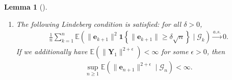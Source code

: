 \documentclass[12pt]{amsart}
\theoremstyle{plain}
\newtheorem{lemma}[theorem]{Lemma}
\theoremstyle{remark}
\numberwithin{equation}{section}
\begin{document}
\begin{lemma}[]
{\begin{enumerate}
Additionally, if $\boldsymbol{\Gamma}_n \stackrel{a.s.}{\to} \boldsymbol{x}_0$ for some $\boldsymbol{x}_0 \in {D}_s$ and $\boldsymbol{\mathcal{P}}$ is continuous at $\boldsymbol{x}_0$, then
\begin{align}\label{eq:lem-Sigmaconv}
\sigma^2\left(\boldsymbol{\Gamma}_{n}\right) \stackrel{a.s.}{\to} \sigma^2\left(\boldsymbol{x}_0\right), \quad \boldsymbol{\Sigma}\left(\boldsymbol{\Gamma}_{n}\right) \stackrel{a.s.}{\to} \boldsymbol{\Sigma}\left(\boldsymbol{x}_0\right).
\end{align}
\item{}\label{item3} The following Lindeberg condition is satisfied: for all $\delta > 0$,
    \begin{align}\label{eq:lind}
    \frac{1}{n}\sum_{k=1}^{n}\mathbb{E}\left( \|\boldsymbol{e}_{k+1}\|^2 \mathbf{1}\left\{\|\boldsymbol{e}_{k+1}\| \geq \delta\sqrt{n}\right\}\mid \mathcal{G}_{k}\right) \stackrel{a.s.}{\to} 0.
    \end{align}
If we additionally have $\mathbb{E}\left(\|\boldsymbol{Y}_1\|^{2+\epsilon}\right) < \infty$ for some $\epsilon > 0$, then
\begin{align}\label{eq:sup}
        \sup_{n \geq 1} \mathbb{E}\left( \|\boldsymbol{e}_{n+1}\|^{2+\epsilon} \mid \mathcal{G}_{n}\right) < \infty.
\end{align}
\end{enumerate}}
\end{lemma}
\end{document}
